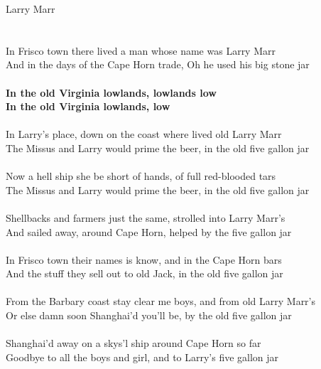 \documentclass[letterpaper,9pt]{article}
\begin{document}
\newpage
{}
\huge
Larry Marr\\
\\
\LARGE
\noindent
\\In Frisco town there lived a man whose name was Larry Marr
\\And in the days of the Cape Horn trade, Oh he used his big stone jar
\\
\\\textbf{In the old Virginia lowlands, lowlands low
\\In the old Virginia lowlands, low}
\\
\\In Larry's place, down on the coast where lived old Larry Marr
\\The Missus and Larry would prime the beer, in the old five gallon jar
\\
\\Now a hell ship she be short of hands, of full red-blooded tars
\\The Missus and Larry would prime the beer, in the old five gallon jar
\\
\\Shellbacks and farmers just the same, strolled into Larry Marr's
\\And sailed away, around Cape Horn, helped by the five gallon jar
\\
\\In Frisco town their names is know, and in the Cape Horn bars
\\And the stuff they sell out to old Jack, in the old five gallon jar
\\
\\From the Barbary coast stay clear me boys, and from old Larry Marr's
\\Or else damn soon Shanghai'd you'll be, by the old five gallon jar
\\
\\Shanghai'd away on a skys'l ship around Cape Horn so far
\\Goodbye to all the boys and girl, and to Larry's five gallon jar
\end{document}
